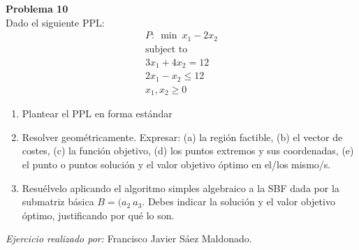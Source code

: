 \documentclass[11pt,table]{article}
\newenvironment{problem}[2][Problema]
    { \begin{mdframed}[backgroundcolor=gray!20] \textbf{#1 #2} \\}
    {  \end{mdframed}}
\begin{document}
\begin{problem}{10}
    Dado el siguiente PPL:
    \begin{align*}
    P: \ \min \ x_{1} - 2x_{2}\\
    \text{subject to} \\
    3x_{1} + 4x_{2} = 12 \\
    2x_{1} - x_{2} \leq 12\\
    x_{1},x_{2} \geq 0
    \end{align*}
    \begin{enumerate}
    \item Plantear el PPL en forma estándar
    \item Resolver geométricamente. Expresar: (a) la región factible, (b) el vector de costes, (c) la función objetivo, (d)  los puntos extremos y sus coordenadas, (e) el punto o puntos solución y el valor objetivo óptimo en el/los mismo/s.
            \item Resuélvelo aplicando el algoritmo simples algebraico a la SBF dada por la submatriz básica \(B=(a_{2} \ a_{3}\). Debes indicar la solución y el valor objetivo óptimo, justificando por qué lo son.
            \end{enumerate}
    \end{problem}
    \emph{Ejercicio realizado por:} Francisco Javier Sáez Maldonado. 
\end{document}
